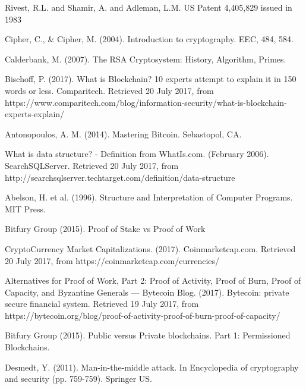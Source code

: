 \begin{thebibliography}{99}




Rivest, R.L. and Shamir, A. and Adleman, L.M. US Patent 4,405,829 issued in 1983

Cipher, C., \& Cipher, M. (2004). Introduction to cryptography. EEC, 484, 584.


Calderbank, M. (2007). The RSA Cryptosystem: History, Algorithm, Primes.


Bischoff, P. (2017). What is Blockchain? 10 experts attempt to explain it in 150 words or less. Comparitech. Retrieved 20 July 2017, from https://www.comparitech.com/blog/information-security/what-is-blockchain-experts-explain/

{\sc Antonopoulos, A. M.} (2014).
Mastering Bitcoin.
{\em} Sebastopol, CA.

What is data structure? - Definition from WhatIs.com. (February 2006). SearchSQLServer. Retrieved 20 July 2017, from http://searchsqlserver.techtarget.com/definition/data-structure

{\sc Abelson, H. et al.} (1996).
Structure and Interpretation of Computer Programs.
MIT Press.

Bitfury Group (2015). Proof of Stake vs Proof of Work

CryptoCurrency Market Capitalizations. (2017). Coinmarketcap.com. Retrieved 20 July 2017, from https://coinmarketcap.com/currencies/

Alternatives for Proof of Work, Part 2: Proof of Activity, Proof of Burn, Proof of Capacity, and Byzantine Generals — Bytecoin Blog. (2017). Bytecoin: private secure financial system. Retrieved 19 July 2017, from https://bytecoin.org/blog/proof-of-activity-proof-of-burn-proof-of-capacity/

Bitfury Group (2015). Public versus Private blockchains. Part 1: Permissioned Blockchains.

Desmedt, Y. (2011). Man-in-the-middle attack. In Encyclopedia of cryptography and security (pp. 759-759). Springer US.


\end{thebibliography}

